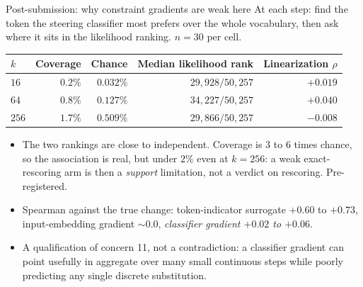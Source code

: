 \documentclass{beamer}
\begin{document}
\begin{frame}[noframenumbering]{Post-submission: why constraint gradients are weak here}
  \small
  At each step: find the token the steering classifier most prefers over the whole vocabulary,
  then ask where it sits in the likelihood ranking. $n=30$ per cell.
  \begin{center}
  \scriptsize
  \begin{tabular}{lrrrr}
    \toprule
    $k$ & Coverage & Chance & Median likelihood rank & Linearization $\rho$ \\
    \midrule
    $16$  & $\bm{0.2\%}$ & $0.032\%$ & $29{,}928/50{,}257$ & $+0.019$ \\
    $64$  & $\bm{0.8\%}$ & $0.127\%$ & $34{,}227/50{,}257$ & $+0.040$ \\
    $256$ & $\bm{1.7\%}$ & $0.509\%$ & $29{,}866/50{,}257$ & $-0.008$ \\
    \bottomrule
  \end{tabular}
  \end{center}
  \vspace{0.3em}
  \begin{itemize}\small
    \item {} The two
      rankings are close to independent. Coverage is $3$ to $6$ times chance, so the association
      is real, but under $2\%$ even at $k=256$: a weak exact-rescoring arm is then a
      \emph{support} limitation, not a verdict on rescoring. Pre-registered.
    \item {} Spearman against the true change: token-indicator surrogate
      $+0.60$ to $+0.73$, input-embedding gradient ${\sim}0.0$, \emph{classifier gradient
      $+0.02$ to $+0.06$}.
    \item A qualification of concern 11, not a contradiction: a classifier gradient can point
      usefully in aggregate over many small continuous steps while poorly predicting any single
      discrete substitution.
  \end{itemize}
\end{frame}
\end{document}
